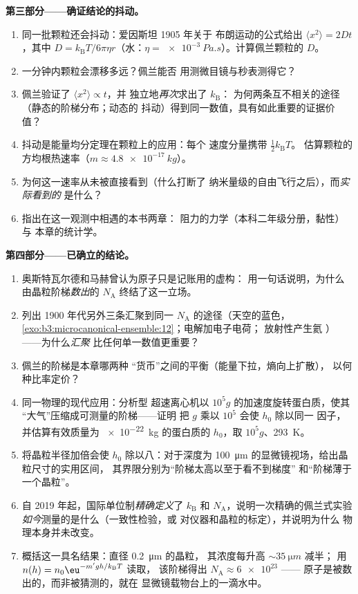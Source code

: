 \begin{problem}
\medskip\noindent\textbf{第三部分——确证结论的抖动。}
\begin{enumerate}[resume]
  \item 同一批颗粒还会抖动：爱因斯坦 1905 年关于
        布朗运动的公式给出 $\langle x^2\rangle = 2Dt$，其中 $D =
        k_{\text{B}}T/6\pi\eta r$（水：$\eta =
        \qty{e-3}{Pa.s}$）。计算佩兰颗粒的 $D$。
  \item 一分钟内颗粒会漂移多远？佩兰能否
        用测微目镜与秒表测得它？
  \item 佩兰验证了 $\langle x^2\rangle \propto t$，并
        独立地\emph{再次}求出了 $k_{\text{B}}$：
        为何两条互不相关的途径（静态的阶梯分布；动态的
        抖动）得到同一数值，具有如此重要的证据价值？
  \item 抖动是能量均分定理在颗粒上的应用：每个
        速度分量携带 $\tfrac12 k_{\text{B}}T$。
        估算颗粒的方均根热速率（$m \approx
        \qty{4.8e-17}{kg}$）。
  \item 为何这一速率从未被直接看到（什么打断了
        纳米量级的自由飞行之后），而\emph{实际看到的}
        是什么？
  \item 指出在这一观测中相遇的本书两章：
        阻力的力学（本科二年级分册，黏性）与
        本章的统计学。
\end{enumerate}

\medskip\noindent\textbf{第四部分——已确立的结论。}
\begin{enumerate}[resume]
  \item 奥斯特瓦尔德和马赫曾认为原子只是记账用的虚构：
        用一句话说明，为什么由晶粒阶梯\emph{数出}的
        $N_{\text{A}}$ 终结了这一立场。
  \item 列出 1900 年代另外三条汇聚到同一
        $N_{\text{A}}$ 的途径（天空的蓝色，
        \cref{exo:b3:microcanonical-ensemble:12}；电解加电子电荷；
        放射性产生氦
        ）——为什么\emph{汇聚}
        比任何单一数值更重要？
  \item 佩兰的阶梯是本章哪两种
        “货币”之间的平衡（能量下拉，熵向上扩散），
        以何种比率定价？
  \item 同一物理的现代应用：分析型
        超速离心机以 $10^5g$ 的加速度旋转蛋白质，使其
        “大气”压缩成可测量的阶梯——证明
        把 $g$ 乘以 $10^5$ 会使 $h_0$ 除以同一
        因子，并估算有效质量为
        \qty{e-22}{kg} 的蛋白质的 $h_0$，取 $10^5g$、\qty{293}{K}。
  \item 将晶粒半径加倍会使 $h_0$ 除以八：对于深度为
        \qty{100}{\micro m} 的显微镜视场，给出晶粒尺寸的实用区间，
        其界限分别为“阶梯太高以至于看不到梯度”
        和“阶梯薄于一个晶粒”。
  \item 自 2019 年起，国际单位制\emph{精确定义}了 $k_{\text{B}}$ 和
        $N_{\text{A}}$，说明一次精确的佩兰式实验
        \emph{如今}测量的是什么（一致性检验，或
        对仪器和晶粒的标定），并说明为什么
        物理本身并未改变。
  \item 概括这一具名结果：直径 \qty{0.2}{\micro m} 的晶粒，
        其浓度每升高 $\sim\qty{35}{\micro m}$ 减半；
        用 $n(h) = n_0\eu^{-m'gh/k_{\text{B}}T}$ 读取，
        该阶梯得出 $N_{\text{A}} \approx \num{6e23}$ ——
        原子是被数出的，而非被猜测的，就在
        显微镜载物台上的一滴水中。
\end{enumerate}
\end{problem}
